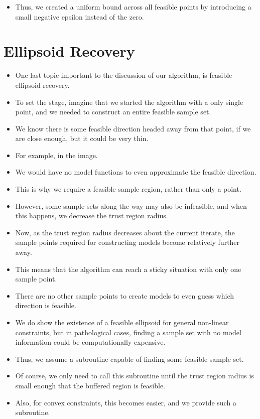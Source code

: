 \documentclass{article}
\begin{document}
\hrulefill

\begin{itemize}
\item Thus, we created a uniform bound across all feasible points by introducing a small negative epsilon instead of the zero.
\end{itemize}



	\section{Ellipsoid Recovery}
\begin{itemize}
\item One last topic important to the discussion of our algorithm, is feasible ellipsoid recovery.
\item To set the stage, imagine that we started the algorithm with a only single point, and we needed to construct an entire feasible sample set.
\item We know there is some feasible direction headed away from that point, if we are close enough, but it could be very thin.
\item For example, in the image.
\item We would have no model functions to even approximate the feasible direction.
\item This is why we require a feasible sample region, rather than only a point.
\item However, some sample sets along the way may also be infeasible, and when this happens, we decrease the trust region radius.
\item Now, as the trust region radius decreases about the current iterate, the sample points required for constructing models become relatively further away.
\item This means that the algorithm can reach a sticky situation with only one sample point.
\item There are no other sample points to create models to even guess which direction is feasible.
\item We do show the existence of a feasible ellipsoid for general non-linear constraints, but in pathological cases, finding a sample set with no model information could be computationally expensive.
\item Thus, we assume a subroutine capable of finding some feasible sample set.
\item Of course, we only need to call this subroutine until the trust region radius is small enough that the buffered region is feasible.
\item Also, for convex constraints, this becomes easier, and we provide such a subroutine.
\end{itemize}
\end{document}
